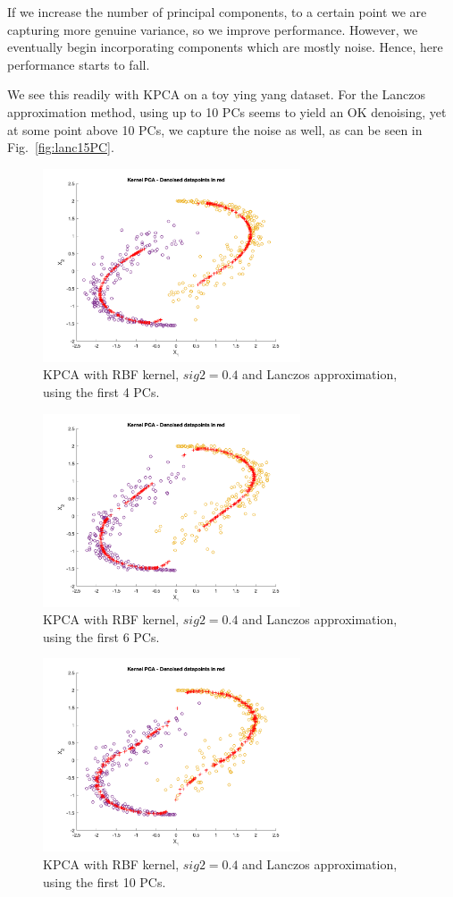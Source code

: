 \documentclass[10pt,a4paper]{article}
\begin{document}
If we increase the number of principal components, to a certain point we are capturing more genuine variance, so we improve performance. However, we eventually begin incorporating components which are mostly noise. Hence, here performance starts to fall.

We see this readily with KPCA on a toy ying yang dataset. For the Lanczos approximation method, using up to 10 PCs seems to yield an OK denoising, yet at some point above 10 PCs, we capture the noise as well, as can be seen in Fig.~\ref{fig:lanc15PC}.

\begin{figure}[h!]
\centering
  \includegraphics[width=3in]{lanc4PC.png}
  \caption{KPCA with RBF kernel, $sig2 = 0.4$ and Lanczos approximation, using the first 4 PCs.}
  \label{fig:lanc4PC}
\end{figure}

\begin{figure}[h!]
\centering
  \includegraphics[width=3in]{lanc6PC.png}
  \caption{KPCA with RBF kernel, $sig2 = 0.4$ and Lanczos approximation, using the first 6 PCs.}
  \label{fig:lanc6PC}
\end{figure}

\begin{figure}[h!]
\centering
  \includegraphics[width=3in]{lanc10PC.png}
  \caption{KPCA with RBF kernel, $sig2 = 0.4$ and Lanczos approximation, using the first 10 PCs.}
  \label{fig:lanc10PC}
\end{figure}
\end{document}
